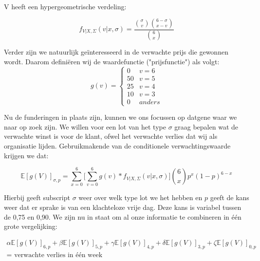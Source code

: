 \documentclass[a4paper, oneside, book]{memoir}
\begin{document}
V heeft een hypergeometrische verdeling:

\begin{equation}
  f_{V|X,\Sigma}(v|x,\sigma) = \frac{\binom{\sigma}{v}\binom{6 - \sigma}{x-v}}{\binom{6}{x}}
\end{equation}

Verder zijn we natuurlijk geïnteresseerd in de verwachte prijs die gewonnen wordt. Daarom definiëren wij de
waardefunctie ("prijsfunctie") als volgt:
\begin{equation}
  g(v) =
  \begin{cases}
     0 & v = 6\\
    50 & v = 5\\
    25 & v = 4\\
    10 & v = 3\\
    0 & anders
  \end{cases}
\end{equation}

Nu de funderingen in plaats zijn, kunnen we ons focussen op datgene waar we naar op zoek zijn. We willen voor een lot van het type $\sigma$ graag bepalen wat de verwachte winst is voor de klant, ofwel het verwachte verlies dat wij als organisatie lijden. Gebruikmakende van de conditionele verwachtingswaarde krijgen we dat:

\begin{equation}
  \mathbb{E}[g(V)]_{\sigma,p} = \sum_{x=0}^{6} \Bigg[ \sum_{v=0}^{6} g(v) * f_{V|X,\Sigma}(v|x,\sigma) \Bigg] \binom{6}{x} p^{x}(1-p)^{6-x}
\end{equation}

Hierbij geeft subscript $\sigma$ weer over welk type lot we het hebben en $p$ geeft de kans weer dat er sprake is van een klachteloze vrije dag. Deze kans is variabel tussen de 0,75 en 0,90.
We zijn nu in staat om al onze informatie te combineren in één grote vergelijking:

\begin{multline}
    \alpha\mathbb{E}[g(V)]_{6,p} + \beta\mathbb{E}[g(V)]_{5,p} + \gamma\mathbb{E}[g(V)]_{4,p} + \delta\mathbb{E}[g(V)]_{3,p} + \zeta\mathbb{E}[g(V)]_{0,p} \\
        = \mbox{ verwachte verlies in één week}
\end{multline}
\end{document}
